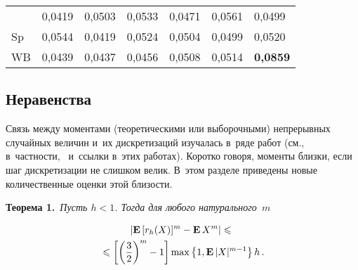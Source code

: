 \begin{table*}
\begin{center}
\begin{tabular}{|l|l|l|l|l|l|l|}
\hspace*{4mm}{\bf S}&0,0419&0,0503&0,0533&0,0471&0,0561&0,0499\\
\hspace*{4mm}Sp&0,0544&0,0419&0,0524&0,0504&0,0499&0,0520\\
\hspace*{4mm}WB&0,0439&0,0437&0,0456&0,0508&0,0514&{\bf 0,0859}\\
\hline
\end{tabular}
\end{center}
\vspace*{-9pt}
\end{table*}

\begin{multicols}{2}


\section{Неравенства}


Связь между моментами (теоретическими или выборочными) непрерывных случайных величин и~их дискретизаций
изучалась в~ряде работ (см., в~част\-ности,~\cite{6-us, 10-us, 11-us, 12-us, 13-us, 14-us} и~ссылки в~этих работах).
Коротко говоря, моменты близки, если шаг дискретизации не слишком велик. В~этом разделе приведены
новые количественные оценки этой близости.


\noindent
\textbf{Теорема 1.}\ \textit{Пусть $h<1$. Тогда для любого натурального~$m$}

\vspace*{-2pt}

\noindent
\begin{multline*}
|\mathbf{E}\,[r_h(X)]^m-\mathbf{E}\, X^m|\leqslant{}\\
{}\leqslant
\left[\left(\displaystyle\frac{\displaystyle 3\mathstrut}{\displaystyle 2\mathstrut}\right)^m-1\right]\max\left\{1,\mathbf{E}\,|X|^{m-1}\right\}h\,.
\end{multline*}



\end{multicols}
